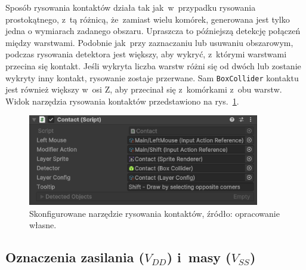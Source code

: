 Sposób rysowania kontaktów działa tak jak~w~przypadku rysowania prostokątnego,
z~tą różnicą, że~zamiast wielu komórek, generowana jest tylko jedna o wymiarach zadanego obszaru.
Upraszcza to późniejszą detekcję połączeń między warstwami.
Podobnie jak~przy zaznaczaniu lub usuwaniu obszarowym,
podczas rysowania detektora jest większy, aby wykryć, z~którymi warstwami przecina się kontakt.
Jeśli wykryta liczba warstw różni się od dwóch lub zostanie wykryty inny kontakt,
rysowanie zostaje przerwane.
Sam \texttt{BoxCollider} kontaktu jest również większy w~osi Z,
aby przecinał się z~komórkami z~obu warstw.
Widok narzędzia rysowania kontaktów przedstawiono na rys.~\ref{fig:contact}.

\begin{figure}[h!]
    \centering
    \includegraphics[width=0.9\textwidth]{chapters/chapter4/rys/tools/contact}
    \caption[Skonfigurowane narzędzie rysowania kontaktów.]
        {Skonfigurowane narzędzie rysowania kontaktów, źródło: opracowanie własne.}
    \label{fig:contact}
\end{figure}

\subsection{Oznaczenia zasilania ($V_{DD}$) i~masy ($V_{SS}$)}
\label{subsec:oznaczenia_zasilania}

